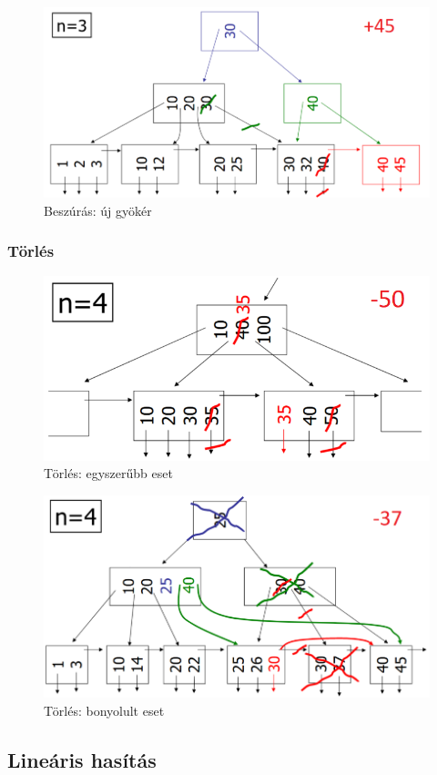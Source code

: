\documentclass[12pt,a4paper]{article}
\begin{document}
\begin{figure}[h!]
	\centering
	\includegraphics[width=0.65\linewidth]{"b+ beszúrás új gyökér"}
	\captionsetup{labelformat=empty}
	\caption{Beszúrás: új gyökér}
\end{figure}

\pagebreak

\subsubsection{Törlés}

\begin{figure}[h!]
	\centering
	\includegraphics[width=0.55\linewidth]{"b+ törlés egyszerűbb"}
	\captionsetup{labelformat=empty}
	\caption{Törlés: egyszerűbb eset}
\end{figure}

\begin{figure}[h!]
	\centering
	\includegraphics[width=0.65\linewidth]{"b+ törlés bonyolultabb"}
	\captionsetup{labelformat=empty}
	\caption{Törlés: bonyolult eset}
\end{figure}

\subsection{Lineáris hasítás}
\end{document}
